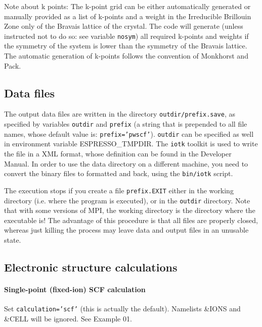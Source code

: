 \documentclass[12pt,a4paper]{article}
\begin{document}
Note about k points: The k-point grid can be either automatically generated 
or manually provided as a list of k-points and a weight in the Irreducible
Brillouin Zone only of the Bravais lattice of the crystal. The code will 
generate (unless instructed not to do so: see variable \texttt{nosym}) all
required k-points
and weights if the symmetry of the system is lower than the symmetry of the
Bravais lattice. The automatic generation of k-points follows the convention
of Monkhorst and Pack.

\subsection{Data files}

The output data files are written in the directory \texttt{outdir/prefix.save}, as specified by variables
\texttt{outdir} and \texttt{prefix} 
(a string that is prepended
to all file names, whose default value is: \texttt{prefix='pwscf'}). \texttt{outdir} can be specified
as well in environment variable ESPRESSO\_TMPDIR. The \texttt{iotk}
toolkit is used to write the file in a XML format, whose definition can
be found in the Developer Manual. In order to use the data directory
on a different machine, you need to convert the binary files to formatted
and back, using the \texttt{bin/iotk} script.

The execution stops if you create a file \texttt{prefix.EXIT} either
in the working directory (i.e. where the program is executed), or in
the  \texttt{outdir} directory. Note that with some versions of MPI,
the working directory  is the directory where the executable is! 
The advantage of this procedure is that all files are properly closed, 
whereas  just killing the process may leave data and output files in 
an unusable state.

\subsection{Electronic structure calculations}
\paragraph{Single-point (fixed-ion) SCF calculation} 
Set \texttt{calculation='scf'} (this is actually the default).
Namelists \&IONS and \&CELL will be ignored. See Example 01.
\end{document}
